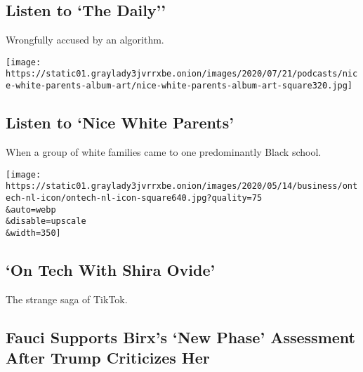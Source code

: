 \href{/2020/08/03/podcasts/the-daily/algorithmic-justice-racism.html}{}

\hypertarget{listen-to-the-daily}{%
\subsection{Listen to `The Daily''}\label{listen-to-the-daily}}

Wrongfully accused by an algorithm.

\href{/2020/07/30/podcasts/nice-white-parents-serial.html}{}

\texttt{[image: https://static01.graylady3jvrrxbe.onion/images/2020/07/21/podcasts/nice-white-parents-album-art/nice-white-parents-album-art-square320.jpg]}

\href{/2020/07/30/podcasts/nice-white-parents-serial.html}{}

\hypertarget{listen-to-nice-white-parents}{%
\subsection{Listen to `Nice White
Parents'}\label{listen-to-nice-white-parents}}

When a group of white families came to one predominantly Black school.

\href{/2020/08/03/technology/tiktok-microsoft.html}{}

\texttt{[image: https://static01.graylady3jvrrxbe.onion/images/2020/05/14/business/ontech-nl-icon/ontech-nl-icon-square640.jpg?quality=75\\\&auto=webp\\\&disable=upscale\\\&width=350]}

\href{/2020/08/03/technology/tiktok-microsoft.html}{}

\hypertarget{on-tech-with-shira-ovide}{%
\subsection{`On Tech With Shira Ovide'}\label{on-tech-with-shira-ovide}}

The strange saga of TikTok.

\href{/2020/08/03/world/coronavirus-covid-19.html}{}

\hypertarget{fauci-supports-birxs-new-phase-assessment-after-trump-criticizes-her}{%
\subsection{Fauci Supports Birx's `New Phase' Assessment After Trump
Criticizes
Her}\label{fauci-supports-birxs-new-phase-assessment-after-trump-criticizes-her}}

